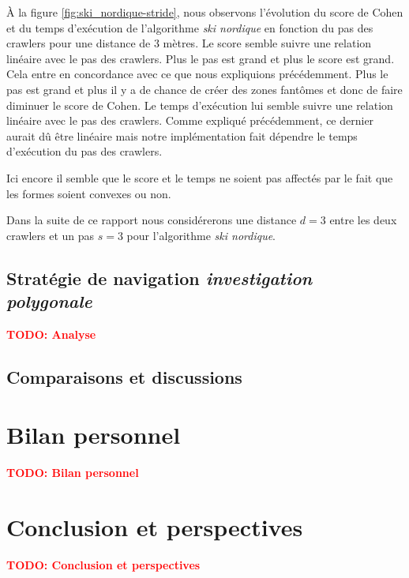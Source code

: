 \documentclass[francais,RandD]{rapportPFE}
\newcommand{\TODO}[1]{\textcolor{red}{\textbf{TODO: #1}}}
\begin{document}
			À la figure \ref{fig:ski_nordique-stride}, nous observons l'évolution du score de Cohen et du temps d'exécution de l'algorithme \textit{ski nordique} en fonction du pas des crawlers pour une distance de 3 mètres.
			Le score semble suivre une relation linéaire avec le pas des crawlers.
			Plus le pas est grand et plus le score est grand.
			Cela entre en concordance avec ce que nous expliquions précédemment.
			Plus le pas est grand et plus il y a de chance de créer des zones fantômes et donc de faire diminuer le score de Cohen.
			Le temps d'exécution lui semble suivre une relation linéaire avec le pas des crawlers.
			Comme expliqué précédemment, ce dernier aurait dû être linéaire mais notre implémentation fait dépendre le temps d'exécution du pas des crawlers.

			Ici encore il semble que le score et le temps ne soient pas affectés par le fait que les formes soient convexes ou non.

			Dans la suite de ce rapport nous considérerons une distance $d = 3$ entre les deux crawlers et un pas $s = 3$ pour l'algorithme \textit{ski nordique}.
		\subsection*{Stratégie de navigation \textit{investigation polygonale}}
			\TODO{Analyse}
		\subsection*{Comparaisons et discussions}
	\section{Bilan personnel}
		\TODO{Bilan personnel}
	\section{Conclusion et perspectives}
		\TODO{Conclusion et perspectives}
	\section*{}
	
	
	\appendix
\end{document}
